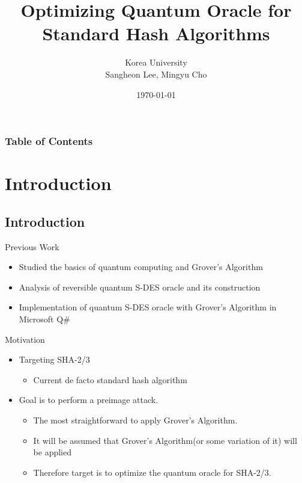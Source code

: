 \documentclass{beamer}
\title{Optimizing Quantum Oracle for Standard Hash Algorithms}
\author{Korea University\\Sangheon Lee, Mingyu Cho}
\date{\today}
\begin{document}
    \begin{frame}
        \titlepage
    \end{frame}

    \begin{frame}
        \frametitle{Table of Contents}
        \tableofcontents
    \end{frame}
    
    \section{Introduction}
    \subsection{Introduction}
    \begin{frame}{Previous Work}
        \begin{itemize}
            \item Studied the basics of quantum computing and Grover's Algorithm
            \item Analysis of reversible quantum S-DES oracle and its construction
            \item Implementation of quantum S-DES oracle with Grover's Algorithm in Microsoft Q\#
        \end{itemize}
    \end{frame}
    
    \begin{frame}{Motivation}
        \begin{itemize}
          \item Targeting SHA-2/3
          \begin{itemize}
            \item Current de facto standard hash algorithm
          \end{itemize}
          \item Goal is to perform a preimage attack.
          \begin{itemize}
            \item The most straightforward to apply Grover's Algorithm.
            \item It will be assumed that Grover's Algorithm(or some variation of it) will be applied
            \item Therefore target is to optimize the quantum oracle for SHA-2/3.
          \end{itemize}
        \end{itemize}
    \end{frame}
    
\end{document}
